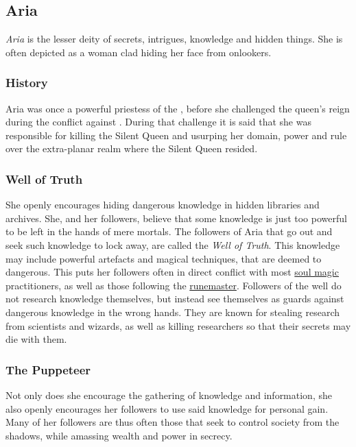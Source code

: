 \subsection{Aria}
\label{sec:Aria}


\emph{Aria} is the lesser deity of secrets, intrigues, knowledge and hidden
things. She is often depicted as a woman clad hiding her face from onlookers.

\subsubsection{History}

Aria was once a powerful priestess of the , before
she challenged the queen's reign during the conflict against
.  During that challenge it is said that she was
responsible for killing the Silent Queen and usurping her domain, power and
rule over the extra-planar realm where the Silent Queen resided.

\subsubsection{Well of Truth}
\label{sec:Well of Truth}

She openly encourages hiding dangerous knowledge in hidden libraries and
archives. She, and her followers, believe that some knowledge is just too
powerful to be left in the hands of mere mortals. The followers of Aria
that go out and seek such knowledge to lock away, are called the \emph{Well of
  Truth}. This knowledge may include powerful artefacts and magical
techniques, that are deemed to dangerous. This puts her followers often in
direct conflict with most \hyperref[sec:Soul Magic]{soul magic} practitioners,
as well as those following the \hyperref[sec:Runemaster]{runemaster}. Followers
of the well do not research knowledge themselves, but instead see themselves
as guards against dangerous knowledge in the wrong hands. They are known for
stealing research from scientists and wizards, as well as killing researchers
so that their secrets may die with them.

\subsubsection{The Puppeteer}

Not only does she encourage the gathering of knowledge and information, she
also openly encourages her followers to use said knowledge for personal gain.
Many of her followers are thus often those that seek to control society from
the shadows, while amassing wealth and power in secrecy.

